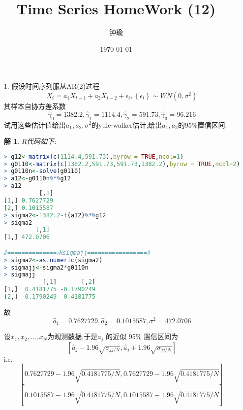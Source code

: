 \documentclass[11pt,a4paper]{ctexart}
\title{Time Series HomeWork (12)}
\author{钟瑜 \quad 222018314210044}
\date{\today}
\newtheorem*{solution}{解}
\begin{document}
\maketitle
\pagestyle{plain}%
\begin{enumerate}
	
\item[1.] 假设时间序列服从AR(2)过程
$$X_t=a_1X_{t-1}+a_2X_{t-2}+\epsilon_t,\left\lbrace \epsilon_t\right\rbrace \sim WN(0,\sigma^2)$$
其样本自协方差系数$$\hat{\gamma}_0=1382.2,\hat{\gamma}_1=1114.4,\hat{\gamma}_2=591.73,\hat{\gamma}_3=96.216$$
试用这些估计值给出$ a_1,a_2,\sigma^2 $的yule-walker估计,给出$ a_1,a_2 $的95\%置信区间.
\begin{solution}
R代码如下:
\end{solution}

\begin{lstlisting}[language=r]
> g12<-matrix(c(1114.4,591.73),byrow = TRUE,ncol=1)
> g0110<-matrix(c(1382.2,591.73,591.73,1382.2),byrow = TRUE,ncol=2)
> g0110n<-solve(g0110)
> a12<-g0110n%*%g12
> a12
          [,1]
[1,] 0.7627729
[2,] 0.1015587
> sigma2<-1382.2-t(a12)%*%g12
> sigma2
         [,1]
[1,] 472.0706

#==============求sigmajj=================#
> sigma2<-as.numeric(sigma2)   
> sigmajj<-sigma2*g0110n
> sigmajj
           [,1]       [,2]
[1,]  0.4181775 -0.1790249
[2,] -0.1790249  0.4181775
\end{lstlisting}
故$$ \hat{a}_1= 0.7627729,\hat{a}_2=0.1015587,\sigma^2=472.0706$$

设$ x_1, x_2, ..., x_N  $为观测数据,于是$ a_j $ 的近似
95\% 置信区间为$$ [\hat{a}_j-1.96\sqrt{\sigma_{jj/N}},\hat{a}_j+1.96\sqrt{\sigma_{jj/N}}]$$
i.e.
$$[0.7627729-1.96\sqrt{0.4181775/N},0.7627729-1.96\sqrt{0.4181775/N}]$$
$$[0.1015587-1.96\sqrt{0.4181775/N},0.1015587-1.96\sqrt{0.4181775/N}]$$
\end{enumerate}
\end{document}
